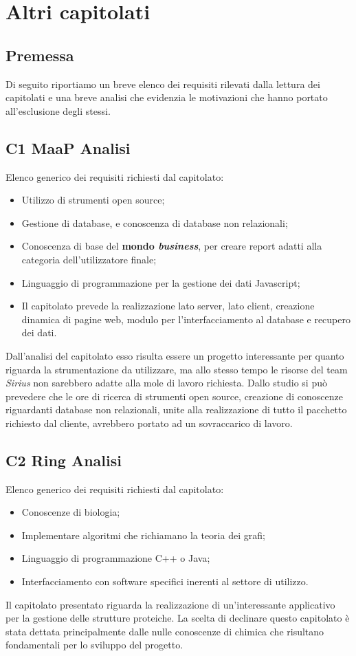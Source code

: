 
\section{Altri capitolati}
\subsection{Premessa}
Di seguito riportiamo un breve elenco dei requisiti rilevati dalla lettura dei capitolati e una breve analisi che evidenzia le motivazioni che hanno portato all'esclusione degli stessi.\\
\subsection{C1 MaaP Analisi}
Elenco generico dei requisiti richiesti dal capitolato:
\begin{itemize} 
\item Utilizzo di strumenti open source;
\item Gestione di database, e conoscenza di database non relazionali;
\item Conoscenza di base del \textbf{mondo \textit{business}}, per creare report adatti alla categoria dell'utilizzatore finale;
\item Linguaggio di programmazione per la gestione dei dati Javascript;
\item Il capitolato prevede la realizzazione lato server, lato client, creazione dinamica di pagine web, modulo per l'interfacciamento al database e recupero dei dati.
\end{itemize}
Dall'analisi del capitolato esso risulta essere un progetto interessante per quanto riguarda la strumentazione da utilizzare, ma allo stesso tempo le risorse del team \textit{Sirius} non sarebbero adatte alla mole di lavoro richiesta. Dallo studio si può prevedere che le ore di ricerca di strumenti open source, creazione di conoscenze riguardanti database non relazionali, unite alla realizzazione di tutto il pacchetto richiesto dal cliente, avrebbero portato ad un sovraccarico di lavoro.
\\
\subsection{C2 Ring Analisi}
Elenco generico dei requisiti richiesti dal capitolato:
\begin{itemize} 
\item Conoscenze di biologia;
\item Implementare algoritmi che richiamano la teoria dei grafi;
\item Linguaggio di programmazione C++ o Java;
\item Interfacciamento con software specifici inerenti al settore di utilizzo.
\end{itemize}
Il capitolato presentato riguarda la realizzazione di un'interessante applicativo per la gestione delle strutture proteiche. La scelta di declinare questo capitolato è stata dettata principalmente dalle nulle conoscenze di chimica che risultano fondamentali per lo sviluppo del progetto.\\
